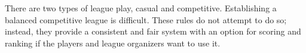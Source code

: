 There are two types of league play, casual and competitive.
Establishing a balanced competitive league is difficult.
These rules do not attempt to do so; instead, they provide a consistent and fair system with an option for scoring and ranking if the players and league organizers want to use it.
